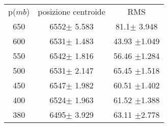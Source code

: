 \begin{center}
\begin{tabulary}{\textwidth}{CCC}
\toprule
p($mb$) &  posizione centroide & RMS \\ 
650 & 6552$\pm$ 5.583 & 81.1$\pm$ 3.948 \\
600 & 6531$\pm$ 1.483 & 43.93 $\pm$1.049 \\
550 & 6542$\pm$ 1.816 & 56.46 $\pm$1.284 \\
500 & 6531$\pm$ 2.147 & 65.45 $\pm$1.518 \\
450 & 6547$\pm$ 1.982 & 60.51 $\pm$1.402 \\
400 & 6524$\pm$ 1.963 & 61.52 $\pm$1.388 \\
380 & 6495$\pm$ 3.929 & 63.11 $\pm$2.778 \\


 \bottomrule
\end{tabulary}
\end{center}
